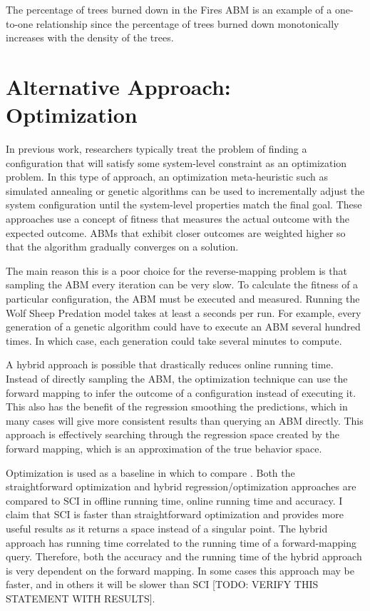 The percentage of trees burned down in the Fires ABM is an example of a one-to-one relationship since the percentage of trees burned down monotonically increases with the density of the trees.


\section{Alternative Approach: Optimization}
In previous work, researchers typically treat the problem of finding a configuration that will satisfy some system-level constraint as an optimization problem.
In this type of approach, an optimization meta-heuristic such as simulated annealing or genetic algorithms can be used to incrementally adjust the system configuration until the system-level properties match the final goal.
These approaches use a concept of fitness that measures the actual outcome with the expected outcome.
ABMs that exhibit closer outcomes are weighted higher so that the algorithm gradually converges on a solution.

The main reason this is a poor choice for the reverse-mapping problem is that sampling the ABM every iteration can be very slow.
To calculate the fitness of a particular configuration, the ABM must be executed and measured.
Running the Wolf Sheep Predation model takes at least a seconds per run.
For example, every generation of a genetic algorithm could have to execute an ABM several hundred times.
In which case, each generation could take several minutes to compute.

A hybrid approach is possible that drastically reduces online running time.
Instead of directly sampling the ABM, the optimization technique can use the forward mapping to infer the outcome of a configuration instead of executing it.
This also has the benefit of the regression smoothing the predictions, which in many cases will give more consistent results than querying an ABM directly.
This approach is effectively searching through the regression space created by the forward mapping, which is an approximation of the true behavior space.

Optimization is used as a baseline in which to compare \fw.
Both the straightforward optimization and hybrid regression/optimization approaches are compared to SCI in offline running time, online running time and accuracy.
I claim that SCI is faster than straightforward optimization and provides more useful results as it returns a space instead of a singular point.
The hybrid approach has running time correlated to the running time of a forward-mapping query.
Therefore, both the accuracy and the running time of the hybrid approach is very dependent on the forward mapping.
In some cases this approach may be faster, and in others it will be slower than SCI [TODO: VERIFY THIS STATEMENT WITH RESULTS].

